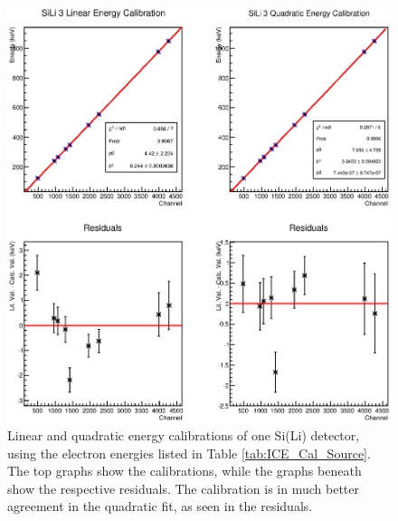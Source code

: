\begin{figure}
    \centering
    \includegraphics[scale=0.75]{Setup_Figs/sili_3.eps}
    \caption{Linear and quadratic energy calibrations of one Si(Li) detector, using the electron energies listed in Table \ref{tab:ICE_Cal_Source}. The top graphs show the calibrations, while the graphs beneath show the respective residuals. The calibration is in much better agreement in the quadratic fit, as seen in the residuals.}
    \label{fig:iceball_cal}
\end{figure}